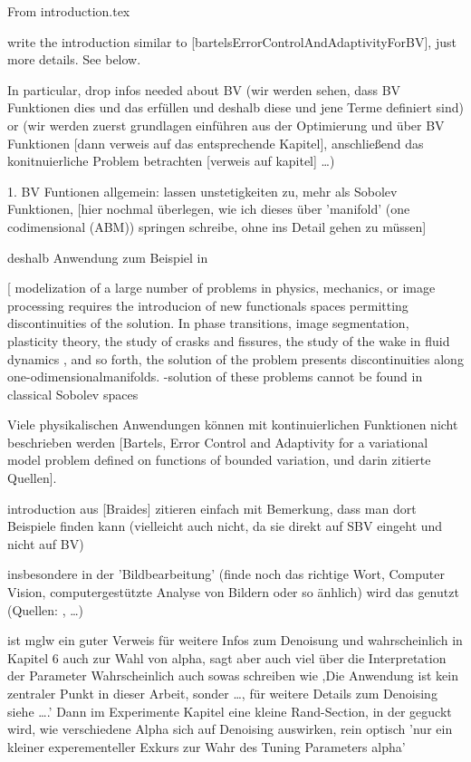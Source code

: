 From introduction.tex

write the introduction similar to
[bartelsErrorControlAndAdaptivityForBV], just more details. See below.

In particular, drop infos needed about BV (wir werden sehen, dass BV Funktionen
dies und das erfüllen und deshalb diese und jene Terme definiert sind)
or (wir werden zuerst grundlagen einführen aus der Optimierung und über BV 
Funktionen [dann verweis auf das entsprechende Kapitel], anschließend
das konitnuierliche Problem betrachten [verweis auf kapitel] \ldots)
\bigskip

1. BV Funtionen allgemein: lassen unstetigkeiten zu, mehr als Sobolev 
Funktionen,
[hier nochmal überlegen, wie ich dieses über 'manifold' (one codimensional
(ABM)) springen schreibe, ohne ins Detail gehen zu müssen]
\medskip

deshalb Anwendung zum Beispiel in
\medskip

[\cite{ABM14} modelization of a large number of problems in physics, mechanics,
or image processing requires the introducion of new functionals spaces
permitting discontinuities of the solution. In phase transitions, image
segmentation, plasticity theory, the study of crasks and fissures, the study of
the wake in fluid dynamics , and so forth, the solution of the problem presents
discontinuities along one-odimensionalmanifolds.
-solution of these problems cannot be found in classical Sobolev spaces
\medskip

Viele physikalischen Anwendungen können mit kontinuierlichen Funktionen nicht
beschrieben werden [Bartels, Error Control and Adaptivity for a variational
model problem defined on functions of bounded variation, und darin zitierte
Quellen].
\medskip

introduction aus [Braides] zitieren einfach mit Bemerkung, dass man dort
Beispiele finden kann (vielleicht auch nicht, da sie direkt auf SBV
eingeht und nicht auf BV)
\medskip

insbesondere in der 'Bildbearbeitung' (finde
noch das richtige Wort, Computer Vision, computergestützte Analyse von Bildern
oder so änhlich) wird das genutzt
(Quellen: \cite{AK06}, \ldots)

\cite{Get12} ist mglw ein guter Verweis für weitere Infos zum Denoisung und
wahrscheinlich in Kapitel 6 auch zur Wahl von alpha, sagt
aber auch viel über die Interpretation der Parameter
Wahrscheinlich auch sowas schreiben wie ,Die Anwendung ist kein zentraler
Punkt in dieser Arbeit, sonder \ldots, für weitere Details zum Denoising siehe
\ldots.' Dann im Experimente Kapitel eine kleine Rand-Section, in der geguckt
wird, wie verschiedene Alpha sich auf Denoising auswirken, rein optisch 'nur
ein kleiner experementeller Exkurs zur Wahr des Tuning Parameters alpha'

